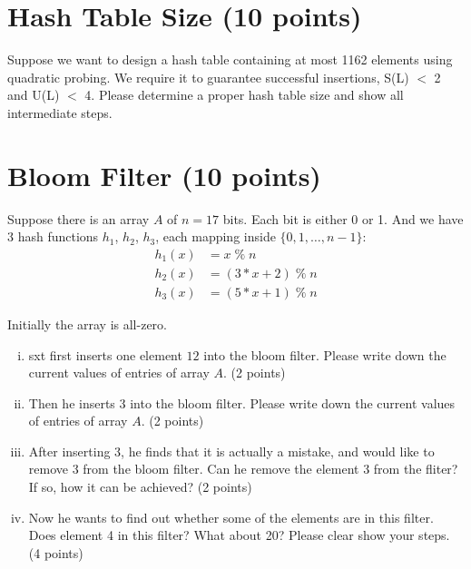\documentclass[11pt]{exam}
\begin{document}

\section{Hash Table Size (10 points)}
Suppose we want to design a hash table containing at most 1162 elements using quadratic probing. We require it to guarantee successful insertions, S(L) $<$ 2 and U(L) $<$ 4. Please determine a proper hash table size and show all intermediate steps.
\begin{solution}
\end{solution}

\section{Bloom Filter (10 points)}
Suppose there is an array $A$ of $n=17$ bits. Each bit is either 0 or 1. And we have 3 hash functions $h_1$, $h_2$, $h_3$, each mapping inside $\{0,1,\dots,n-1\}$:
\begin{align*}
h_1(x) &= x \;\%\; n\\
h_2(x) &= (3*x+2) \;\%\; n\\
h_3(x) &= (5*x+1) \;\%\; n 
\end{align*}

Initially the array is all-zero.
\begin{enumerate}[i)]
\item sxt first inserts one element $12$ into the bloom filter. Please write down the current values of entries of array $A$. (2 points)
\begin{solution}
\end{solution}
\item Then he inserts 3 into the bloom filter. Please write down the current values of entries of array $A$. (2 points)
\begin{solution}
\end{solution}
\item After inserting 3, he finds that it is actually a mistake, and would like to remove 3 from the bloom filter. Can he remove the element 3 from the fliter? If so, how it can be achieved? (2 points)
\begin{solution}
\end{solution}
\item Now he wants to find out whether some of the elements are in this filter. Does element 4 in this filter? What about 20? Please clear show your steps. (4 points)
\begin{solution}
\end{solution}
\end{enumerate}
\end{document}
